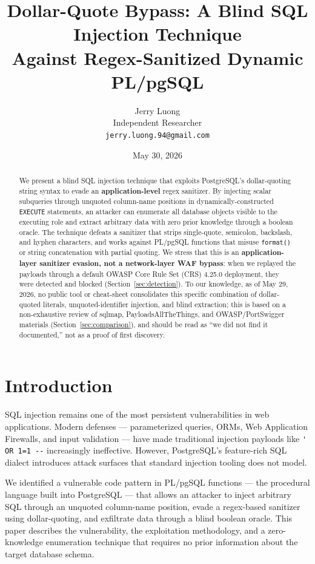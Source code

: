 \documentclass[11pt]{article}
\title{\textbf{Dollar-Quote Bypass: A Blind SQL Injection Technique\\
Against Regex-Sanitized Dynamic PL/pgSQL}}
\author{Jerry Luong\\
\small Independent Researcher\\
\small \texttt{jerry.luong.94@gmail.com}}
\date{May 30, 2026}
\begin{document}
\maketitle

\begin{abstract}
\noindent
We present a blind SQL injection technique that exploits PostgreSQL's
dollar-quoting string syntax to evade an \textbf{application-level} regex
sanitizer. By injecting scalar subqueries through unquoted column-name positions
in dynamically-constructed \lstinline|EXECUTE| statements, an attacker can
enumerate all database objects visible to the executing role and extract
arbitrary data with zero prior knowledge through a boolean oracle. The technique
defeats a sanitizer that strips single-quote, semicolon, backslash, and hyphen
characters, and works against PL/pgSQL functions that misuse \lstinline|format()|
or string concatenation with partial quoting. We stress that this is an
\textbf{application-layer sanitizer evasion, not a network-layer WAF bypass}: when
we replayed the payloads through a default OWASP Core Rule Set (CRS) 4.25.0
deployment, they were detected and blocked (Section~\ref{sec:detection}). To our
knowledge, as of May 29, 2026, no public tool or cheat-sheet consolidates this
specific combination of dollar-quoted literals, unquoted-identifier injection, and
blind extraction; this is based on a non-exhaustive review of sqlmap,
PayloadsAllTheThings, and OWASP/PortSwigger materials
(Section~\ref{sec:comparison}), and should be read as ``we did not find it
documented,'' not as a proof of first discovery.
\end{abstract}

\section{Introduction}

SQL injection remains one of the most persistent vulnerabilities in web
applications. Modern defenses --- parameterized queries, ORMs, Web Application
Firewalls, and input validation --- have made traditional injection payloads like
\lstinline|' OR 1=1 --| increasingly ineffective. However, PostgreSQL's
feature-rich SQL dialect introduces attack surfaces that standard injection
tooling does not model.

We identified a vulnerable code pattern in PL/pgSQL functions --- the procedural
language built into PostgreSQL --- that allows an attacker to inject arbitrary SQL
through an unquoted column-name position, evade a regex-based sanitizer using
dollar-quoting, and exfiltrate data through a blind boolean oracle. This paper
describes the vulnerability, the exploitation methodology, and a zero-knowledge
enumeration technique that requires no prior information about the target database
schema.
\end{document}
